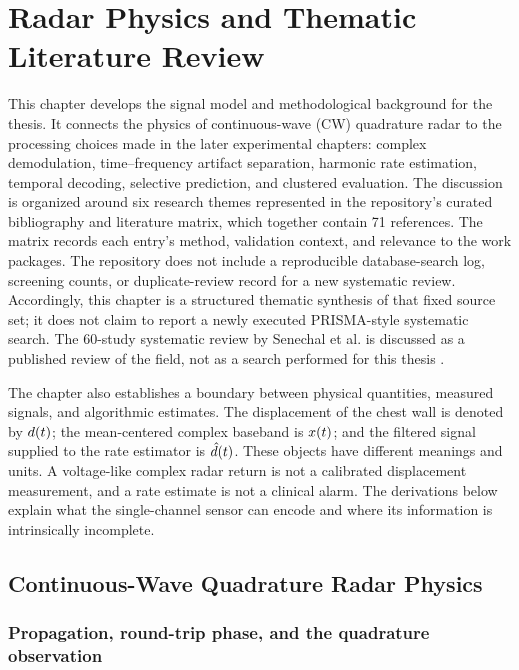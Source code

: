 \chapter{Radar Physics and Thematic Literature Review}
\label{ch:physics_related_work}

This chapter develops the signal model and methodological background for the thesis. It connects
the physics of continuous-wave (CW) quadrature radar to the processing choices made in the later
experimental chapters: complex demodulation, time--frequency artifact separation, harmonic rate
estimation, temporal decoding, selective prediction, and clustered evaluation. The discussion is
organized around six research themes represented in the repository's curated bibliography and
literature matrix, which together contain 71 references. The matrix records each entry's method,
validation context, and relevance to the work packages. The repository does not include a
reproducible database-search log, screening counts, or duplicate-review record for a new systematic
review. Accordingly, this chapter is a structured thematic synthesis of that fixed source set; it
does not claim to report a newly executed PRISMA-style systematic search. The 60-study systematic
review by Senechal et al. is discussed as a published review of the field, not as a search performed
for this thesis \citep{senechal2026next}.

The chapter also establishes a boundary between physical quantities, measured signals, and
algorithmic estimates. The displacement of the chest wall is denoted by $d(t)$; the
mean-centered complex baseband is $x(t)$; and the filtered signal supplied to the rate
estimator is $\hat{d}(t)$. These objects have different meanings and units. A voltage-like
complex radar return is not a calibrated displacement measurement, and a rate estimate is not a
clinical alarm. The derivations below explain what the single-channel sensor can encode and where
its information is intrinsically incomplete.

\section{Continuous-Wave Quadrature Radar Physics}
\label{sec:ch2_radar_physics}

\subsection{Propagation, round-trip phase, and the quadrature observation}

